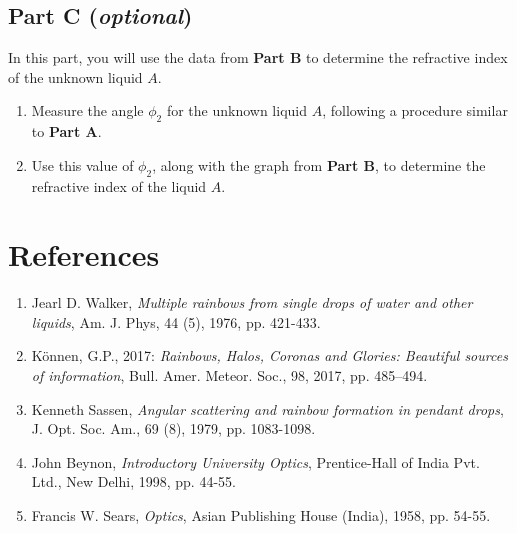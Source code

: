   
 

\subsection*{Part C (\textit{optional})}


In this part, you will use the data from \textbf{Part B} to determine the refractive index of the unknown liquid $A$. 

\begin{enumerate}
    \item Measure the angle $\phi_2$ for the unknown liquid $A$, following a procedure similar to \textbf{Part A}.
    
    \item Use this value of $\phi_2$, along with the graph from \textbf{Part B}, to determine the refractive index of the liquid $A$.
\end{enumerate}



\section*{References}
\begin{enumerate}
\item Jearl D. Walker, \textit{Multiple rainbows from single drops of water and other liquids}, Am. J. Phys, 44 (5), 1976, pp. 421-433.
\item Können, G.P., 2017: \textit{Rainbows, Halos, Coronas and Glories: Beautiful sources of information}, Bull. Amer. Meteor. Soc., 98, 2017, pp. 485–494.
\item Kenneth Sassen, \textit{Angular scattering and rainbow formation in pendant drops}, J. Opt. Soc. Am., 69 (8), 1979, pp. 1083-1098. 
\item John Beynon, \textit{Introductory University Optics}, Prentice-Hall of India Pvt. Ltd., New Delhi, 1998, pp. 44-55.
\item Francis W. Sears, \textit{Optics}, Asian Publishing House (India), 1958, pp. 54-55. 

\end{enumerate}

